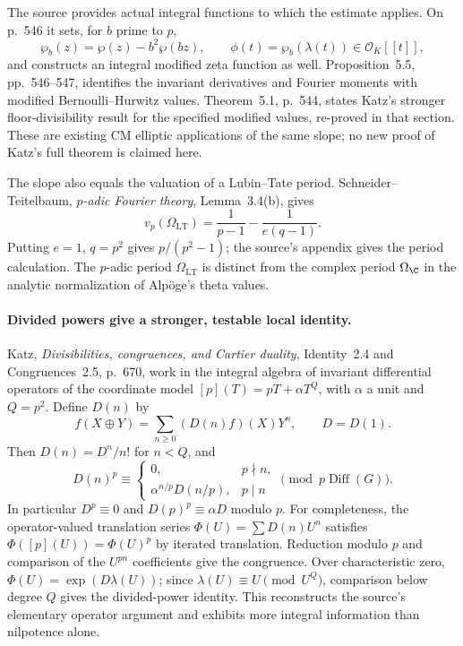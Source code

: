 \documentclass[11pt]{article}
\theoremstyle{definition}\newtheorem{definition}[theorem]{Definition}\newtheorem{remark}[theorem]{Remark}
\begin{document}
The source provides actual integral functions to which the estimate
applies. On p.~546 it sets, for $b$ prime to $p$,
\[
 \wp_b(z)=\wp(z)-b^2\wp(bz),\qquad
 \phi(t)=\wp_b(\lambda(t))\in\mathcal O_K[[t]],
\]
and constructs an integral modified zeta function as well.
Proposition~5.5, pp.~546--547, identifies the invariant derivatives
and Fourier moments with modified Bernoulli--Hurwitz values.
Theorem~5.1, p.~544, states Katz's stronger floor-divisibility
result for the specified modified values, re-proved in that section.
These are existing CM elliptic applications of the same slope; no
new proof of Katz's full theorem is claimed here.

The slope also equals the valuation of a Lubin--Tate period.
Schneider--Teitelbaum, \emph{$p$-adic Fourier theory},
Lemma~3.4(b), gives
\[
 v_p(\Omega_{\mathrm{LT}})=\frac1{p-1}-\frac1{e(q-1)}.
\]
Putting $e=1$, $q=p^2$ gives $p/(p^2-1)$; the source's appendix
gives the period calculation. The $p$-adic period
$\Omega_{\mathrm{LT}}$ is distinct from the complex period
$\Omega_{\C}$ in the analytic normalization of Alp\"oge's theta
values.

\paragraph{Divided powers give a stronger, testable local identity.}
Katz, \emph{Divisibilities, congruences, and Cartier duality},
Identity~2.4 and Congruences~2.5, p.~670, work in the integral
algebra of invariant differential operators of the coordinate model
$[p](T)=pT+\alpha T^{Q}$, with $\alpha$ a unit and $Q=p^2$.
Define $D(n)$ by
\[
 f(X\mathbin\oplus Y)=\sum_{n\geq0}(D(n)f)(X)Y^n,
 \qquad D=D(1).
\]
Then $D(n)=D^n/n!$ for $n<Q$, and
\[
 D(n)^p\equiv
 \begin{cases}
 0,&p\nmid n,\\
 \alpha^{n/p}D(n/p),&p\mid n
 \end{cases}
 \pmod{p\operatorname{Diff}(G)}.
\]
In particular $D^p\equiv0$ and $D(p)^p\equiv\alpha D$ modulo $p$.
For completeness, the operator-valued translation series
$\Phi(U)=\sum D(n)U^n$ satisfies
$\Phi([p](U))=\Phi(U)^p$ by iterated translation.
Reduction modulo $p$ and comparison of the $U^{pn}$ coefficients
give the congruence. Over characteristic zero,
$\Phi(U)=\exp(D\lambda(U))$; since
$\lambda(U)\equiv U\pmod{U^Q}$, comparison below degree $Q$
gives the divided-power identity. This reconstructs the source's
elementary operator argument and exhibits more integral information
than nilpotence alone.
\end{document}
